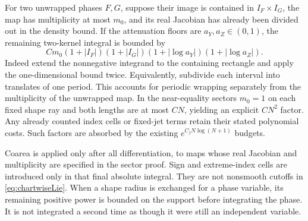 \documentclass[11pt]{article}
\numberwithin{equation}{section}
\theoremstyle{definition}
\begin{document}
For two unwrapped phases \(F,G\), suppose their image is contained
in \(I_F\times I_G\), the map has multiplicity at most \(m_0\),
and its real Jacobian has already been divided out in the density
bound. If the attenuation floors are \(a_Y,a_Z\in(0,1)\), the
remaining two-kernel integral is bounded by
\[
 C m_0(1+|I_F|)(1+|I_G|)
       (1+|\log a_Y|)(1+|\log a_Z|).
\]
Indeed extend the nonnegative integrand to the containing rectangle
and apply the one-dimensional bound twice. Equivalently, subdivide
each interval into translates of one period. This accounts for
periodic wrapping separately from the multiplicity of the unwrapped
map. In the near-equality sectors \(m_0=1\) on each fixed shape
ray and both lengths are at most \(CN\), yielding an explicit
\(CN^2\) factor. Any already counted index cells or fixed-jet
terms retain their stated polynomial costs. Such factors are
absorbed by the existing \(e^{C_jN\log(N+1)}\) budgets.

Coarea is applied only after all differentiation, to maps whose
real Jacobian and multiplicity are specified in the sector proof.
Sign and extreme-index cells are introduced only in that final
absolute integral. They are not nonsmooth cutoffs in
\eqref{eq:chartwiseLie}. When a shape radius is exchanged for a
phase variable, its remaining positive power is bounded on the
support before integrating the phase. It is not integrated a
second time as though it were still an independent variable.
\end{document}
